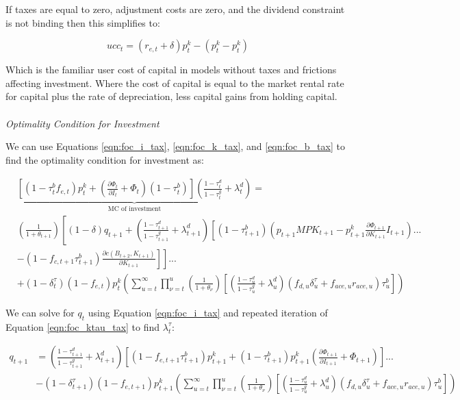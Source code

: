 If taxes are equal to zero, adjustment costs are zero, and the dividend constraint is not binding then this simplifies to:

\begin{equation}
ucc_{t}= (r_{e,t}+ \delta)p^{k}_{t} - (p^{k}_{t}-p^{k}_{t})
\end{equation}

Which is the familiar user cost of capital in models without taxes and frictions affecting investment.  Where the cost of capital is equal to the market rental rate for capital  plus the rate of depreciation, less capital gains from holding capital.\\

\ \\
\noindent\noindent \emph{Optimality Condition for Investment}

We can use Equations \ref{eqn:foc_i_tax}, \ref{eqn:foc_k_tax}, and \ref{eqn:foc_b_tax} to find the optimality condition for investment as:

\begin{equation}
\begin{split}
&\underbrace{ \left[(1-\tau^{b}_{t}f_{e,t})p^{k}_{t} + \left(\frac{\partial \Phi_{t}}{\partial I_{t}} + \Phi_{t}\right)(1-\tau^{b}_{t})\right]\left(\frac{1-\tau^{d}_{t}}{1-\tau^{g}_{t}} + \lambda^{d}_{t}\right)}_{\text{MC of investment}} = \\
& \left(\frac{1}{1+\theta_{t+1}}\right)\left[(1-\delta)q_{t+1}  +  \left(\frac{1-\tau^{d}_{t+1}}{1-\tau^{g}_{t+1}} + \lambda^{d}_{t+1} \right)\left[(1-\tau^{b}_{t+1})\left(p_{t+1}MPK_{t+1}- p^{k}_{t+1}\frac{\partial \Phi_{t+1}}{\partial K_{t+1}}I_{t+1}\right)  ... \right.\right. \\
& \left.\left.-(1-f_{c,t+1}\tau^{b}_{t+1}) \frac{\partial c(B_{t+2},K_{t+1})}{\partial K_{t+1}} \right] \right] ...\\
&  + (1-\delta^{\tau}_{t})(1-f_{e,t})p^{k}_{t}\left(\sum_{u=t}^{\infty} \prod_{\nu=t}^{u}\left(\frac{1}{1+\theta_{\nu}}\right)\left[\left(\frac{1-\tau^{d}_{u}}{1-\tau^{g}_{u}}+\lambda^{d}_{u}\right)\left( f_{d,u}\delta^{\tau}_{u}+f_{ace,u}r_{ace,u} \right)\tau^{b}_{u}\right]\right)
\end{split}
\end{equation}

We can solve for $q_{t}$ using Equation \ref{eqn:foc_i_tax} and repeated iteration of Equation \ref{eqn:foc_ktau_tax} to find $\lambda^{\tau}_{t}$:

\begin{equation}
\begin{split}
q_{t+1} & =  \left(\frac{1-\tau^{d}_{t+1}}{1-\tau^{g}_{t+1}} + \lambda^{d}_{t+1}\right)\left[(1-f_{e,t+1}\tau^{b}_{t+1})p^{k}_{t+1}+ (1-\tau^{b}_{t+1})p^{k}_{t+1}\left(\frac{\partial \Phi_{t+1}}{\partial I_{t+1}} + \Phi_{t+1}\right)\right]... \\
&  -  (1-\delta^{\tau}_{t+1})(1-f_{e,t+1})p^{k}_{t+1}\left(\sum_{u=t}^{\infty} \prod_{\nu=t}^{u}\left(\frac{1}{1+\theta_{\nu}}\right)\left[\left(\frac{1-\tau^{d}_{u}}{1-\tau^{g}_{u}}+\lambda^{d}_{u}\right)\left( f_{d,u}\delta^{\tau}_{u}+f_{ace,u}r_{ace,u} \right)\tau^{b}_{u}\right]\right)
\end{split}
\end{equation}

